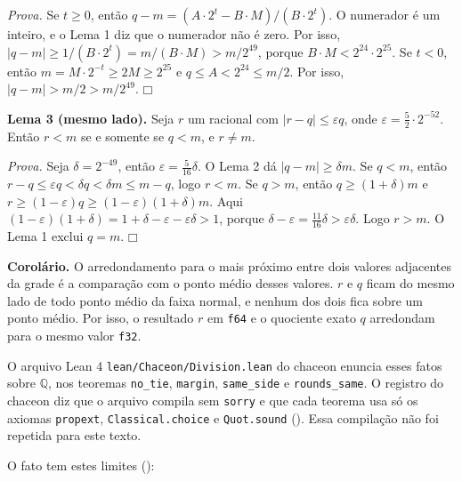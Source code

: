\documentclass[10pt,a4paper,]{article}
\begin{document}
\emph{Prova.} Se \(t \ge 0\), então
\(q - m = (A\cdot 2^{t} - B\cdot M)/(B\cdot 2^{t})\). O numerador é um
inteiro, e o Lema 1 diz que o numerador não é zero. Por isso,
\(|q - m| \ge 1/(B\cdot 2^{t}) = m/(B\cdot M) > m/2^{49}\), porque
\(B\cdot M < 2^{24}\cdot 2^{25}\). Se \(t < 0\), então
\(m = M\cdot 2^{-t} \ge 2M \ge 2^{25}\) e \(q \le A < 2^{24} \le m/2\).
Por isso, \(|q - m| > m/2 > m/2^{49}\). \(\mdlgwhtsquare\)

\textbf{Lema 3 (mesmo lado).} Seja \(r\) um racional com
\(|r - q| \le \varepsilon q\), onde
\(\varepsilon = \tfrac{5}{2}\cdot 2^{-52}\). Então \(r < m\) se e
somente se \(q < m\), e \(r \ne m\).

\emph{Prova.} Seja \(\delta = 2^{-49}\), então
\(\varepsilon = \tfrac{5}{16}\delta\). O Lema 2 dá
\(|q - m| \ge \delta m\). Se \(q < m\), então
\(r - q \le \varepsilon q < \delta q < \delta m \le m - q\), logo
\(r < m\). Se \(q > m\), então \(q \ge (1+\delta)m\) e
\(r \ge (1-\varepsilon)q \ge
(1-\varepsilon)(1+\delta)m\). Aqui
\((1-\varepsilon)(1+\delta) = 1 + \delta - \varepsilon -
\varepsilon\delta > 1\), porque
\(\delta - \varepsilon = \tfrac{11}{16}\delta > \varepsilon\delta\).
Logo \(r > m\). O Lema 1 exclui \(q = m\). \(\mdlgwhtsquare\)

\textbf{Corolário.} O arredondamento para o mais próximo entre dois
valores adjacentes da grade é a comparação com o ponto médio desses
valores. \(r\) e \(q\) ficam do mesmo lado de todo ponto médio da faixa
normal, e nenhum dos dois fica sobre um ponto médio. Por isso, o
resultado \(r\) em \texttt{f64} e o quociente exato \(q\) arredondam
para o mesmo valor \texttt{f32}.

O arquivo Lean 4 \texttt{lean/Chaceon/Division.lean} do chaceon enuncia
esses fatos sobre \(\mathbb{Q}\), nos teoremas \texttt{no\_tie},
\texttt{margin}, \texttt{same\_side} e \texttt{rounds\_same}. O registro
do chaceon diz que o arquivo compila sem \texttt{sorry} e que cada
teorema usa só os axiomas \texttt{propext}, \texttt{Classical.choice} e
\texttt{Quot.sound} (). Essa
compilação não foi repetida para este texto.

O fato tem estes limites ():
\end{document}
